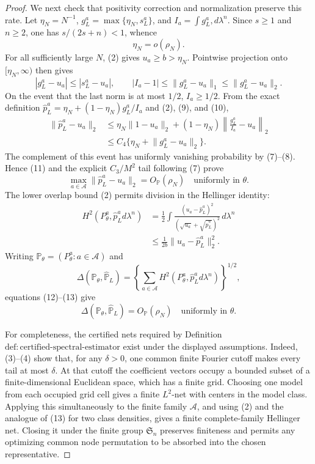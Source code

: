 \documentclass{article}
\begin{document}
\begin{proof}
We next check that positivity correction and normalization preserve this rate.  Let \(\eta_N=N^{-1}\), \(g_L^a=\max\{\eta_N,s_L^a\}\), and \(I_a=\int g_L^a,d\lambda^n\).  Since \(s\geq1\) and \(n\geq2\), one has \(s/(2s+n)<1\), whence
\[
 \eta_N=o(\rho_N).
\tag{9}
\]
For all sufficiently large \(N\), (2) gives \(u_a\geq b>\eta_N\).  Pointwise projection onto \([\eta_N,\infty)\) then gives
\[
 |g_L^a-u_a|\leq|s_L^a-u_a|,
 \qquad
 |I_a-1|\leq\lVert g_L^a-u_a\rVert_1
 \leq\lVert g_L^a-u_a\rVert_2.
\tag{10}
\]
On the event that the last norm is at most \(1/2\), \(I_a\geq1/2\).  From the exact definition
\(
 \widehat p_L^a=\eta_N+(1-\eta_N)g_L^a/I_a
\)
and (2), (9), and (10),
\[
\begin{aligned}
 \lVert\widehat p_L^a-u_a\rVert_2
 &\leq \eta_N\lVert1-u_a\rVert_2
 +(1-\eta_N)\left\lVert\frac{g_L^a}{I_a}-u_a\right\rVert_2\\
 &\leq C_4\{\eta_N+\lVert g_L^a-u_a\rVert_2\}.
\end{aligned}
\tag{11}
\]
The complement of this event has uniformly vanishing probability by (7)--(8).  Hence (11) and the explicit \(C_3/M^2\) tail following (7) prove
\[
 \max_{a\in\mathcal A}\lVert\widehat p_L^a-u_a\rVert_2
 =O_{\mathbb P}(\rho_N)
\quad\text{uniformly in }\theta.
\tag{12}
\]
The lower overlap bound (2) permits division in the Hellinger identity:
\[
\begin{aligned}
 H^2(P_\theta^a,\widehat p_L^a d\lambda^n)
 &=\frac12\int
 \frac{(u_a-\widehat p_L^a)^2}
 {(\sqrt{u_a}+\sqrt{\widehat p_L^a})^2}\,d\lambda^n\\
 &\leq\frac1{2b}\lVert u_a-\widehat p_L^a\rVert_2^2.
\end{aligned}
\tag{13}
\]
Writing \(\mathbb P_\theta=(P_\theta^a:a\in\mathcal A)\) and
\[
 \Delta(\mathbb P_\theta,\widehat{\mathbb P}_L)
 =\left\{\sum_{a\in\mathcal A}
 H^2(P_\theta^a,\widehat p_L^a d\lambda^n)\right\}^{1/2},
\]
equations (12)--(13) give
\[
 \Delta(\mathbb P_\theta,\widehat{\mathbb P}_L)
 =O_{\mathbb P}(\rho_N)
\quad\text{uniformly in }\theta.
\tag{14}
\]

For completeness, the certified nets required by Definition \(\mathrm{def:certified\text{-}spectral\text{-}estimator}\) exist under the displayed assumptions.  Indeed, (3)--(4) show that, for any \(\delta>0\), one common finite Fourier cutoff makes every tail at most \(\delta\).  At that cutoff the coefficient vectors occupy a bounded subset of a finite-dimensional Euclidean space, which has a finite grid.  Choosing one model from each occupied grid cell gives a finite \(L^2\)-net with centers in the model class.  Applying this simultaneously to the finite family \(\mathcal A\), and using (2) and the analogue of (13) for two class densities, gives a finite complete-family Hellinger net.  Closing it under the finite group \(\mathfrak S_n\) preserves finiteness and permits any optimizing common node permutation to be absorbed into the chosen representative.


\end{proof}
\end{document}
